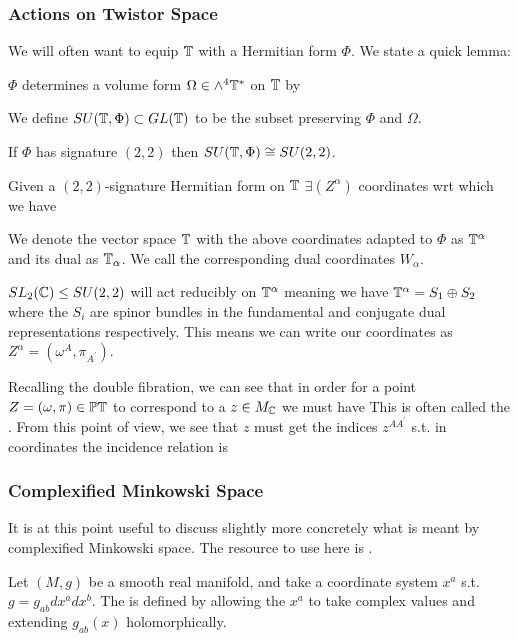 \documentclass{article}
\begin{document}
\subsubsection{Actions on Twistor Space}
We will often want to equip $\mathbb{T}$ with a Hermitian form $\Phi$. We state a quick lemma:
\begin{lemma}
	$\Phi$ determines a volume form $\Omega \in \wedge^4 \mathbb{T}^\ast$ on $\mathbb{T}$ by 
	\eq{
\Omega = \image \Phi \wedge \image \Phi 
}
\end{lemma}
\begin{definition}
	We define $SU(\mathbb{T},\Phi) \subset GL(\mathbb{T})$ to be the subset preserving $\Phi$ and $\Omega$.  
\end{definition}
\begin{example}
	If $\Phi$ has signature $(2,2)$ then $SU(\mathbb{T},\Phi) \cong SU(2,2)$. 
\end{example}
Given a $(2,2)$-signature Hermitian form on $\mathbb{T}$ $\exists(Z^\alpha)$ coordinates wrt which we have 
\begin{notation}
	We denote the vector space $\mathbb{T}$ with the above coordinates adapted to $\Phi$ as $\mathbb{T}^\alpha$ and its dual as $\mathbb{T}_\alpha$. We call the corresponding dual coordinates $W_\alpha$. 
\end{notation}
$SL_2(\mathbb{C}) \leq SU(2,2)$ will act reducibly on $\mathbb{T}^\alpha$ meaning we have $\mathbb{T}^\alpha = S_1 \oplus S_2$ where the $S_i$ are spinor bundles in the fundamental and conjugate dual representations respectively. This means we can write our coordinates as $Z^\alpha = (\omega^A, \pi_{A^\prime})$. 

\begin{remark}
 Recalling the double fibration, we can see that in order for a point $Z = (\omega,\pi) \in \mathbb{PT}$ to correspond to a $z \in M_{\mathbb{C}}$ we must have 
This is often called the . From this point of view, we see that $z$ must get the indices $z^{AA^\prime}$ s.t. in coordinates the incidence relation is 
\end{remark}

\subsubsection{Complexified Minkowski Space}
It is at this point useful to discuss slightly more concretely what is meant by complexified Minkowski space. The resource to use here is \cite{Adamo2018}. 
\begin{definition}
	Let $(M,g)$ be a smooth real manifold, and take a coordinate system $x^a$ s.t. $g= g_{ab} dx^a dx^b$. The  is defined by allowing the $x^a$ to take complex values and extending $g_{ab}(x)$ holomorphically.  
\end{definition}
\end{document}
